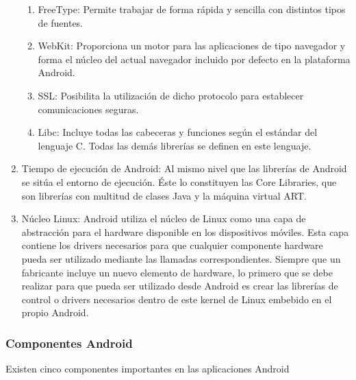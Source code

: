 \begin{enumerate}
\begin{enumerate}
\item	FreeType: Permite trabajar de forma rápida  y sencilla con distintos tipos de fuentes.
\item	WebKit: Proporciona un motor para las aplicaciones de tipo navegador y forma el núcleo del actual navegador incluido por defecto en la plataforma Android.
\item	SSL: Posibilita la utilización de dicho protocolo para establecer comunicaciones seguras.
\item	Libc: Incluye todas las cabeceras y funciones según el estándar del lenguaje C. Todas las demás librerías se definen en este lenguaje.
\end{enumerate}
\item	Tiempo de ejecución de Android: Al mismo nivel que las librerías de Android se sitúa el entorno de ejecución. Éste lo constituyen las Core Libraries, que son librerías con multitud de clases Java y la máquina virtual ART. \cite{ART}
\item Núcleo Linux: Android utiliza el núcleo de Linux como una capa de abstracción para el hardware disponible en los dispositivos móviles. Esta capa contiene los drivers necesarios para que cualquier componente hardware pueda ser utilizado mediante las llamadas correspondientes. Siempre que un fabricante incluye un nuevo elemento de hardware, lo primero que se debe realizar para que pueda ser utilizado desde Android es crear las librerías de control o drivers necesarios dentro de este kernel de Linux embebido en el propio Android. 
\end{enumerate}
\subsubsection{Componentes Android}
Existen cinco componentes importantes en las aplicaciones Android

